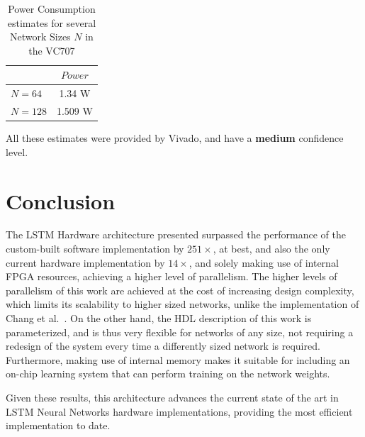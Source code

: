\documentclass{IEEEtran}
\begin{document}
\begin{table}
	\caption{Power Consumption estimates for several Network Sizes $N$ in the VC707}
	\label{tab:power-virtx7}
    \centering
  \begin{tabular}{ | l | c | }
    \hline
     & $Power$  \\
    \hline
    $N=64$ & 1.34 W \\
    \hline
    $N=128$ & 1.509 W\\
\hline
  \end{tabular}

\end{table}

All these estimates were provided by Vivado, and have a \textbf{medium} confidence level.

\section{Conclusion}\label{sec:concl}
The LSTM Hardware architecture presented surpassed the performance of the custom-built software implementation by $251\times$, at best,
and also the only current hardware implementation by $14\times$, and solely making use of internal FPGA
resources, achieving a higher level of parallelism. The higher levels of parallelism of this work are achieved at the cost of increasing
design complexity, which limits its scalability to higher sized networks, unlike the implementation of Chang et al.~\cite{Chang15}.
On the other hand, the HDL description of this work is parameterized, and is thus very flexible for networks of any size, not requiring
a redesign of the system every time a differently sized network is required. Furthermore, making use of internal memory makes it suitable
for including an on-chip learning system that can perform training on the network weights.

Given these results, this architecture advances the current state of the art in LSTM Neural Networks
hardware implementations, providing the most efficient implementation to date.



\end{document}
